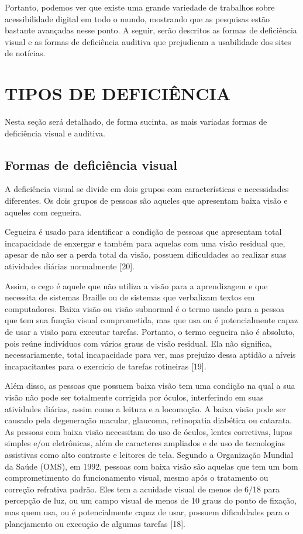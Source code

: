 \documentclass[a4paper]{article}
\begin{document}
\begin{titlepage}
Portanto, podemos ver que existe uma grande variedade de trabalhos sobre acessibilidade digital em todo o mundo, mostrando que as pesquisas estão bastante avançadas nesse ponto. A seguir, serão descritos as formas de deficiência visual e as formas de deficiência auditiva que prejudicam a usabilidade dos sites de notícias.

\section{TIPOS DE DEFICIÊNCIA}
Nesta seção será detalhado, de forma sucinta, as mais variadas formas de deficiência visual e auditiva.

\subsection{Formas de deficiência visual}
A deficiência visual se divide em dois grupos com características e necessidades diferentes. Os dois grupos de pessoas são aqueles que apresentam baixa visão e aqueles com cegueira.

Cegueira é usado para identificar a condição de pessoas que apresentam total incapacidade de enxergar e também para aquelas com uma visão residual que, apesar de não ser a perda total da visão, possuem dificuldades ao realizar suas atividades diárias normalmente [20].

Assim, o cego é aquele que não utiliza a visão para a aprendizagem e que necessita de sistemas Braille ou de sistemas que verbalizam textos em computadores. Baixa visão ou visão subnormal é o termo usado para a pessoa que tem sua função visual comprometida, mas que usa ou é potencialmente capaz de usar a visão para executar tarefas. Portanto, o termo cegueira não é absoluto, pois reúne indivíduos com vários graus de visão residual. Ela não significa, necessariamente, total incapacidade para ver, mas prejuízo dessa aptidão a níveis incapacitantes para o exercício de tarefas rotineiras [19].

Além disso, as pessoas que possuem baixa visão tem uma condição na qual a sua visão não pode ser totalmente corrigida por óculos, interferindo em suas atividades diárias, assim como a leitura e a locomoção. A baixa visão pode ser causado pela degeneração macular, glaucoma, retinopatia diabética ou catarata. As pessoas com baixa visão necessitam do uso de óculos, lentes corretivas, lupas simples e/ou eletrônicas, além de caracteres ampliados e de uso de tecnologias assistivas como alto contraste e leitores de tela. Segundo a Organização Mundial da Saúde (OMS), em 1992, pessoas com baixa visão são aquelas que tem um bom comprometimento do funcionamento visual, mesmo após o tratamento ou correção refrativa padrão. Eles tem a acuidade visual de menos de 6/18 para percepção de luz, ou um campo visual de menos de 10 graus do ponto de fixação, mas quem usa, ou é potencialmente capaz de usar, possuem dificuldades para o planejamento ou execução de algumas tarefas [18].


\end{titlepage}
\end{document}
